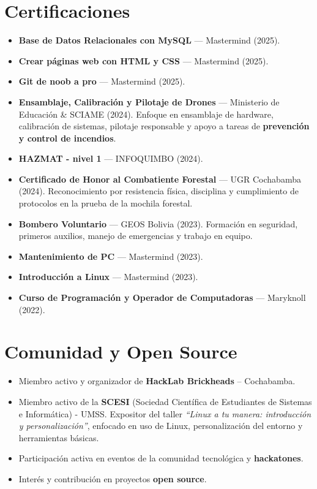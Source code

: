 \documentclass[11pt,a4paper]{article}
\begin{document}
	\section*{Certificaciones}
	\begin{itemize}[leftmargin=*]
		\item \textbf{Base de Datos Relacionales con MySQL} — Mastermind (2025).
		\item \textbf{Crear páginas web con HTML y CSS} — Mastermind (2025).
		\item \textbf{Git de noob a pro} — Mastermind (2025).
		\item \textbf{Ensamblaje, Calibración y Pilotaje de Drones} — Ministerio de Educación \& SCIAME (2024).  
			Enfoque en ensamblaje de hardware, calibración de sistemas, pilotaje responsable y apoyo a tareas de \textbf{prevención y control de incendios}.
	
		\item \textbf{HAZMAT - nivel 1} — INFOQUIMBO (2024).  
		\item \textbf{Certificado de Honor al Combatiente Forestal} — UGR Cochabamba (2024).  
		Reconocimiento por resistencia física, disciplina y cumplimiento de protocolos en la prueba de la mochila forestal.
		\item \textbf{Bombero Voluntario} — GEOS Bolivia (2023).  
		Formación en seguridad, primeros auxilios, manejo de emergencias y trabajo en equipo.
		\item \textbf{Mantenimiento de PC} — Mastermind (2023).
		\item \textbf{Introducción a Linux} — Mastermind (2023).
		\item \textbf{Curso de Programación y Operador de Computadoras} — Maryknoll (2022).
	\end{itemize}
	
	\section*{Comunidad y Open Source}
	\begin{itemize}[leftmargin=*]
		\item Miembro activo y organizador de \textbf{HackLab Brickheads} -- Cochabamba.
		\item Miembro activo de la \textbf{SCESI} (Sociedad Científica de Estudiantes de Sistemas e Informática) - UMSS.
				Expositor del taller \textit{``Linux a tu manera: introducción y personalización''}, enfocado en uso de Linux, personalización del entorno y herramientas básicas.
			
		\item Participación activa en eventos de la comunidad tecnológica y \textbf{hackatones}.
		\item Interés y contribución en proyectos \textbf{open source}.
	\end{itemize}
	
\end{document}
